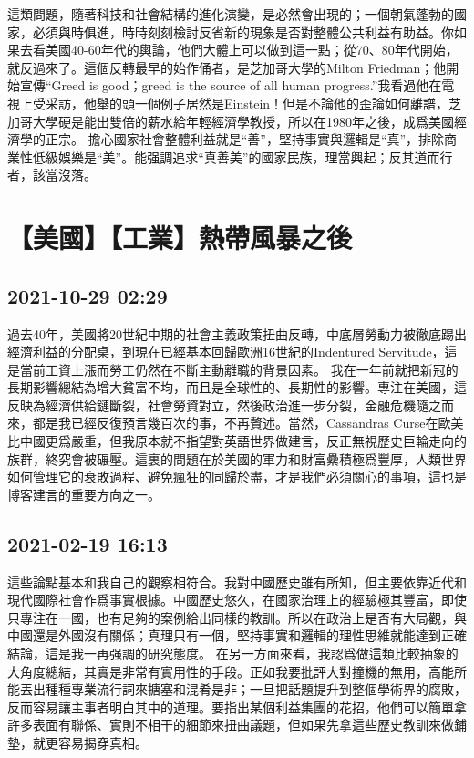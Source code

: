\documentclass[twocolumn]{ctexart}
\begin{document}
這類問題，隨著科技和社會結構的進化演變，是必然會出現的；一個朝氣蓬勃的國家，必須與時俱進，時時刻刻檢討反省新的現象是否對整體公共利益有助益。你如果去看美國40-60年代的輿論，他們大體上可以做到這一點；從70、80年代開始，就反過來了。這個反轉最早的始作俑者，是芝加哥大學的Milton Friedman；他開始宣傳“Greed is good；greed is the source of all human progress.”我看過他在電視上受采訪，他舉的頭一個例子居然是Einstein！但是不論他的歪論如何離譜，芝加哥大學硬是能出雙倍的薪水給年輕經濟學教授，所以在1980年之後，成爲美國經濟學的正宗。
擔心國家社會整體利益就是“善”，堅持事實與邏輯是“真”，排除商業性低級娛樂是“美”。能强調追求“真善美”的國家民族，理當興起；反其道而行者，該當沒落。
\section*{【美國】【工業】熱帶風暴之後}
\subsection*{2021-10-29 02:29}

過去40年，美國將20世紀中期的社會主義政策扭曲反轉，中底層勞動力被徹底踢出經濟利益的分配桌，到現在已經基本回歸歐洲16世紀的Indentured Servitude，這是當前工資上漲而勞工仍然在不斷主動離職的背景因素。
我在一年前就把新冠的長期影響總結為增大貧富不均，而且是全球性的、長期性的影響。專注在美國，這反映為經濟供給鏈斷裂，社會勞資對立，然後政治進一步分裂，金融危機隨之而來，都是我已經反復預言幾百次的事，不再贅述。當然，Cassandras Curse在歐美比中國更爲嚴重，但我原本就不指望對英語世界做建言，反正無視歷史巨輪走向的族群，終究會被碾壓。這裏的問題在於美國的軍力和財富纍積極爲豐厚，人類世界如何管理它的衰敗過程、避免瘋狂的同歸於盡，才是我們必須關心的事項，這也是博客建言的重要方向之一。
\subsection*{2021-02-19 16:13}

這些論點基本和我自己的觀察相符合。我對中國歷史雖有所知，但主要依靠近代和現代國際社會作爲事實根據。中國歷史悠久，在國家治理上的經驗極其豐富，即使只專注在一國，也有足夠的案例給出同樣的教訓。所以在政治上是否有大局觀，與中國還是外國沒有關係；真理只有一個，堅持事實和邏輯的理性思維就能達到正確結論，這是我一再强調的研究態度。
在另一方面來看，我認爲做這類比較抽象的大角度總結，其實是非常有實用性的手段。正如我要批評大對撞機的無用，高能所能丟出種種專業流行詞來搪塞和混肴是非；一旦把話題提升到整個學術界的腐敗，反而容易讓主事者明白其中的道理。要指出某個利益集團的花招，他們可以簡單拿許多表面有聯係、實則不相干的細節來扭曲議題，但如果先拿這些歷史教訓來做鋪墊，就更容易揭穿真相。
\end{document}
